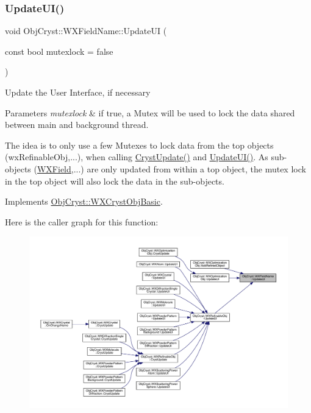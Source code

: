 \subsubsection{\texorpdfstring{UpdateUI()}{UpdateUI()}}
{\footnotesize\ttfamily void Obj\+Cryst\+::\+W\+X\+Field\+Name\+::\+Update\+UI (\begin{DoxyParamCaption}\item[{const bool}]{mutexlock = {\ttfamily false} }\end{DoxyParamCaption})\hspace{0.3cm}{\ttfamily [virtual]}}

Update the User Interface, if necessary


\begin{DoxyParams}{Parameters}
{\em mutexlock} & if true, a Mutex will be used to lock the data shared between main and background thread.\\
\hline
\end{DoxyParams}
The idea is to only use a few Mutexes to lock data from the top objects (wx\+Refinable\+Obj,...), when calling \mbox{\hyperlink{class_obj_cryst_1_1_w_x_field_name_a0c01579606255f9c6d9e6738df89ba3b}{Cryst\+Update()}} and \mbox{\hyperlink{class_obj_cryst_1_1_w_x_field_name_a7a11ccb98cf448f4e964ba5bb1082d68}{Update\+U\+I()}}. As sub-\/objects (\mbox{\hyperlink{class_obj_cryst_1_1_w_x_field}{W\+X\+Field}},...) are only updated from within a top object, the mutex lock in the top object will also lock the data in the sub-\/objects. 

Implements \mbox{\hyperlink{class_obj_cryst_1_1_w_x_cryst_obj_basic_a3818940b7031ff7e45cf2178c4a99c90}{Obj\+Cryst\+::\+W\+X\+Cryst\+Obj\+Basic}}.

Here is the caller graph for this function\+:
\nopagebreak
\begin{figure}[H]
\begin{center}
\leavevmode
\includegraphics[width=350pt]{class_obj_cryst_1_1_w_x_field_name_a7a11ccb98cf448f4e964ba5bb1082d68_icgraph}
\end{center}
\end{figure}


